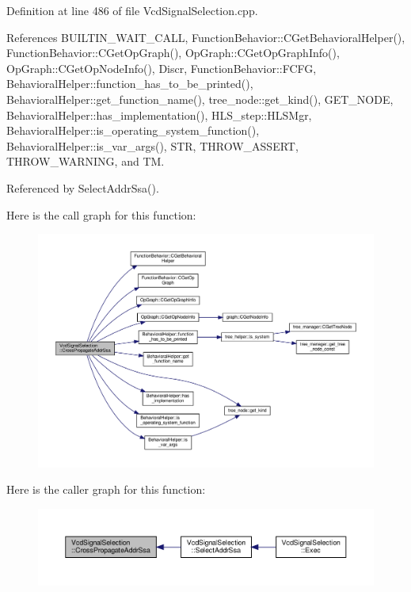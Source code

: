 Definition at line 486 of file Vcd\+Signal\+Selection.\+cpp.



References B\+U\+I\+L\+T\+I\+N\+\_\+\+W\+A\+I\+T\+\_\+\+C\+A\+LL, Function\+Behavior\+::\+C\+Get\+Behavioral\+Helper(), Function\+Behavior\+::\+C\+Get\+Op\+Graph(), Op\+Graph\+::\+C\+Get\+Op\+Graph\+Info(), Op\+Graph\+::\+C\+Get\+Op\+Node\+Info(), Discr, Function\+Behavior\+::\+F\+C\+FG, Behavioral\+Helper\+::function\+\_\+has\+\_\+to\+\_\+be\+\_\+printed(), Behavioral\+Helper\+::get\+\_\+function\+\_\+name(), tree\+\_\+node\+::get\+\_\+kind(), G\+E\+T\+\_\+\+N\+O\+DE, Behavioral\+Helper\+::has\+\_\+implementation(), H\+L\+S\+\_\+step\+::\+H\+L\+S\+Mgr, Behavioral\+Helper\+::is\+\_\+operating\+\_\+system\+\_\+function(), Behavioral\+Helper\+::is\+\_\+var\+\_\+args(), S\+TR, T\+H\+R\+O\+W\+\_\+\+A\+S\+S\+E\+RT, T\+H\+R\+O\+W\+\_\+\+W\+A\+R\+N\+I\+NG, and TM.



Referenced by Select\+Addr\+Ssa().

Here is the call graph for this function\+:
\nopagebreak
\begin{figure}[H]
\begin{center}
\leavevmode
\includegraphics[width=350pt]{dd/de4/classVcdSignalSelection_a7b1ff93c5a9469c61e0558047f601dc5_cgraph}
\end{center}
\end{figure}
Here is the caller graph for this function\+:
\nopagebreak
\begin{figure}[H]
\begin{center}
\leavevmode
\includegraphics[width=350pt]{dd/de4/classVcdSignalSelection_a7b1ff93c5a9469c61e0558047f601dc5_icgraph}
\end{center}
\end{figure}
\mbox{\label{classVcdSignalSelection_a632534f4dfe6c520a1736d508c25c1a1}} 
